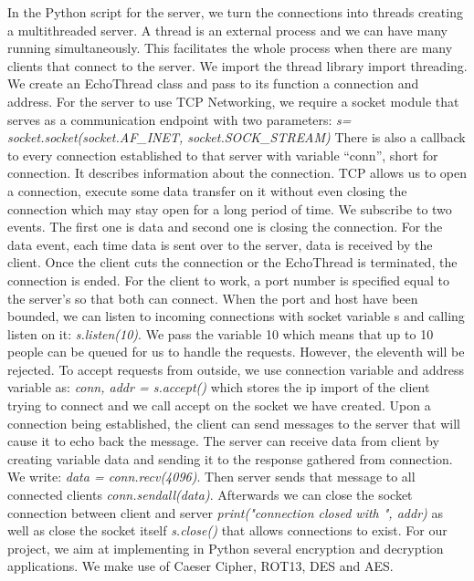 In the Python script for the server, we turn the connections into threads creating a multithreaded server. A thread is an external process and we can have many running simultaneously. This facilitates the whole process when there are many clients that connect to the server. We import the thread library import threading. We create an EchoThread class and pass to its function a connection and address. For the server to use TCP Networking, we require a socket module that serves as a communication endpoint with two parameters:
\textit{s= socket.socket(socket.AF\_INET, socket.SOCK\_STREAM)}
There is also a callback to every connection established to that server with variable “conn”, short for connection. It describes information about the connection. TCP allows us to open a connection, execute some data transfer on it without even closing the connection which may stay open for a long period of time. We subscribe to two events. The first one is data and second one is closing the connection. For the data event, each time data is sent over to the server, data is received by the client. Once the client cuts the connection or the EchoThread is terminated, the connection is ended.
For the client to work, a port number is specified equal to the server’s so that both can connect. When the port and host have been bounded, we can listen to incoming connections with socket variable s and calling listen on it: \textit{s.listen(10)}. We pass the variable 10 which means that up to 10 people can be queued for us to handle the requests. However, the eleventh will be rejected. To accept requests from outside, we use connection variable and address variable as: \textit{conn, addr = s.accept()} which stores the ip import of the client trying to connect and we call accept on the socket we have created. Upon a connection being established, the client can send messages to the server that will cause it to echo back the message. The server can receive data from client by creating variable data and sending it to the response gathered from connection. We write: \textit{data = conn.recv(4096)}. Then server sends that message to all connected clients \textit{conn.sendall(data)}. Afterwards we can close the socket connection between client and server \textit{print("connection closed with ", addr)} as well as close the socket itself \textit{s.close()} that allows connections to exist.
For our project, we aim at implementing in Python several encryption and decryption applications. We make use of Caeser Cipher, ROT13, DES and AES.
